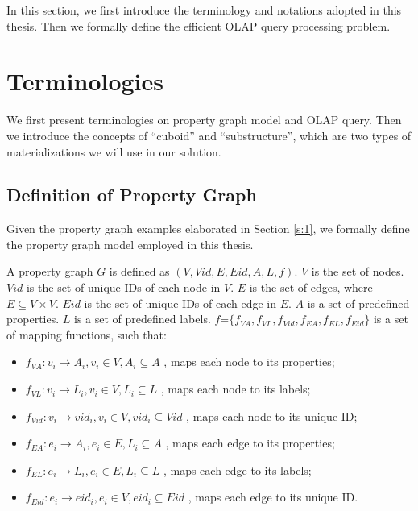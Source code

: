 
In this section, we first introduce the terminology and notations adopted in this thesis. Then we formally define the efficient OLAP query processing problem. 


\section{Terminologies}

We first present terminologies on property graph model and OLAP query. Then we introduce the concepts of ``cuboid'' and ``substructure'', which are two types of materializations we will use in our solution. 


\subsection{Definition of Property Graph}
Given the property graph examples elaborated in Section \ref{s:1}, we formally define the property graph model employed in this thesis. 


A property graph $G$ is defined as $(V, Vid, E, Eid, A, L, f)$. $V$ is the set of nodes. $Vid$ is the set of unique IDs of each node in $V$. $E$ is the set of edges, where $E\subseteq V\times V$. $Eid$ is the set of unique IDs of each edge in $E$. $A$ is a set of predefined properties. $L$ is a set of predefined labels. $f$=$\{f_{VA}, f_{VL}, f_{Vid}, f_{EA}, f_{EL}, f_{Eid}\}$ is a set of mapping functions, such that: 
\begin{itemize}
	\item $f_{VA}: v_{i} \rightarrow A_{i}, v_{i}\in V, A_{i} \subseteq A$ , maps each node to its properties;
	\item $f_{VL}: v_{i} \rightarrow L_{i}, v_{i}\in V, L_{i} \subseteq L$ , maps each node to its labels;
	\item $f_{Vid}: v_{i} \rightarrow vid_{i}, v_{i}\in V, vid_{i} \subseteq Vid$ , maps each node to its unique ID;
	\item $f_{EA}: e_{i} \rightarrow A_{i}, e_{i}\in E, L_{i} \subseteq A$ , maps each edge to its properties;
	\item $f_{EL}: e_{i} \rightarrow L_{i}, e_{i}\in E, L_{i} \subseteq L$ , maps each edge to its labels;
	\item $f_{Eid}: e_{i} \rightarrow eid_{i}, e_{i}\in V, eid_{i} \subseteq Eid$ , maps each edge to its unique ID.
\end{itemize}


